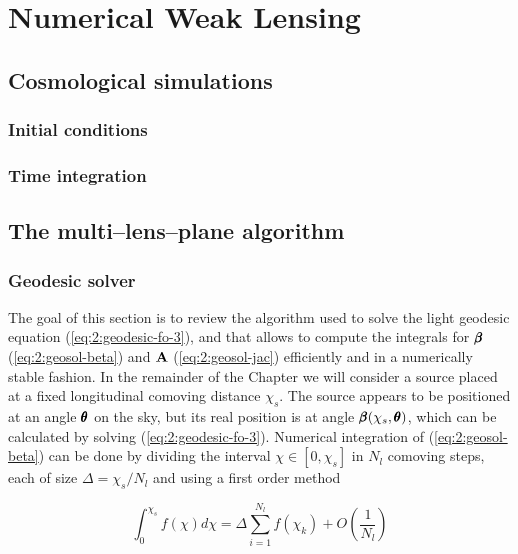 
\chapter{Numerical Weak Lensing}
\lhead[\fancyplain{}{\thepage}]{\fancyplain{}{\rightmark}}
 \thispagestyle{plain}
\setlength{\parindent}{10mm}


\section{Cosmological simulations}

\subsection{Initial conditions}

\subsection{Time integration}

\section{The multi--lens--plane algorithm}

\subsection{Geodesic solver}
The goal of this section is to review the algorithm used to solve the light geodesic equation (\ref{eq:2:geodesic-fo-3}), and that allows to compute the integrals for $\pmb{\beta}$ (\ref{eq:2:geosol-beta}) and $\mathbf{A}$ (\ref{eq:2:geosol-jac}) efficiently and in a numerically stable fashion. In the remainder of the Chapter we will consider a source placed at a fixed longitudinal comoving distance $\chi_s$. The source appears to be positioned at an angle $\pmb{\theta}$ on the sky, but its real position is at angle $\pmb{\beta}(\chi_s,\pmb{\theta})$, which can be calculated by solving (\ref{eq:2:geodesic-fo-3}). Numerical integration of (\ref{eq:2:geosol-beta}) can be done by dividing the interval $\chi\in[0,\chi_s]$ in $N_l$ comoving steps, each of size $\Delta = \chi_s/N_l$ and using a first order method

\begin{equation}
\label{eq:3:int-fo}
\int_0^{\chi_s} f(\chi)d\chi = \Delta\sum_{i=1}^{N_l}f(\chi_k) + O\left(\frac{1}{N_l}\right)
\end{equation} 

